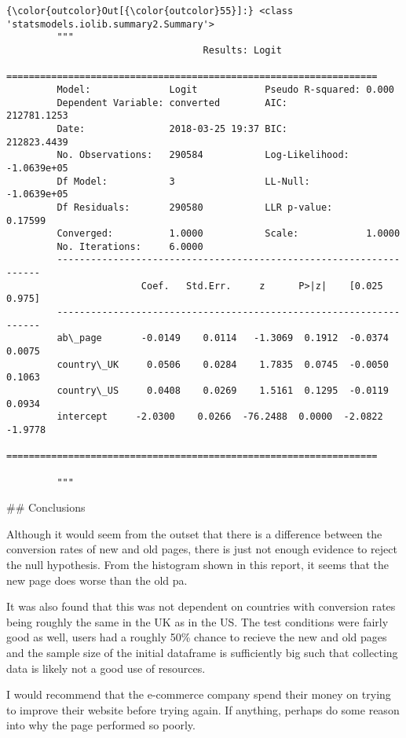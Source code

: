 \documentclass[11pt]{article}
\begin{document}
\begin{Verbatim}[commandchars=\\\{\}]
{\color{outcolor}Out[{\color{outcolor}55}]:} <class 'statsmodels.iolib.summary2.Summary'>
         """
                                   Results: Logit
         ==================================================================
         Model:              Logit            Pseudo R-squared: 0.000      
         Dependent Variable: converted        AIC:              212781.1253
         Date:               2018-03-25 19:37 BIC:              212823.4439
         No. Observations:   290584           Log-Likelihood:   -1.0639e+05
         Df Model:           3                LL-Null:          -1.0639e+05
         Df Residuals:       290580           LLR p-value:      0.17599    
         Converged:          1.0000           Scale:            1.0000     
         No. Iterations:     6.0000                                        
         -------------------------------------------------------------------
                        Coef.   Std.Err.     z      P>|z|    [0.025   0.975]
         -------------------------------------------------------------------
         ab\_page       -0.0149    0.0114   -1.3069  0.1912  -0.0374   0.0075
         country\_UK     0.0506    0.0284    1.7835  0.0745  -0.0050   0.1063
         country\_US     0.0408    0.0269    1.5161  0.1295  -0.0119   0.0934
         intercept     -2.0300    0.0266  -76.2488  0.0000  -2.0822  -1.9778
         ==================================================================
         
         """
\end{Verbatim}
            
     \#\# Conclusions

Although it would seem from the outset that there is a difference
between the conversion rates of new and old pages, there is just not
enough evidence to reject the null hypothesis. From the histogram shown
in this report, it seems that the new page does worse than the old pa.

It was also found that this was not dependent on countries with
conversion rates being roughly the same in the UK as in the US. The test
conditions were fairly good as well, users had a roughly 50\% chance to
recieve the new and old pages and the sample size of the initial
dataframe is sufficiently big such that collecting data is likely not a
good use of resources.

I would recommend that the e-commerce company spend their money on
trying to improve their website before trying again. If anything,
perhaps do some reason into why the page performed so poorly.
\end{document}
